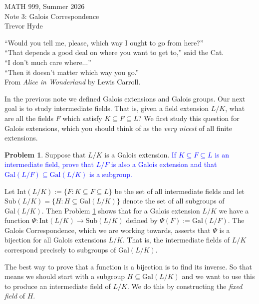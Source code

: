 \documentclass[11pt]{article}
\def\gal{\mathrm{Gal}}
\def\inter{\mathrm{Int}}
\def\sub{\mathrm{Sub}}
\theoremstyle{definition}
\newtheorem{problem}{Problem}[section]
\numberwithin{equation}{subsection}
\newcommand{\head}[1]{
	\begin{center}
		{\large #1}
		\vspace{.05 in}
	\end{center}
	\bigskip 
}
\newcommand{\blue}[1]{\textcolor{blue}{#1}}
\begin{document}
\pagestyle{plain}

\setcounter{section}{3}   

\head{MATH 999, Summer 2026\\ Note 3: Galois Correspondence\\
Trevor Hyde}


\begin{center}
   ``Would you tell me, please, which way I ought to go from here?''\\
   ``That depends a good deal on where you want to get to,'' said the Cat.\\
   ``I don’t much care where$\ldots$''\\
   ``Then it doesn’t matter which way you go.''\\

   \vspace{.1in}
   From \emph{Alice in Wonderland} by Lewis Carroll.
\end{center}
\vspace{.1in}

In the previous note we defined Galois extensions and Galois groups.
Our next goal is to study intermediate fields.
That is, given a field extension $L/K$, what are all the fields $F$ which satisfy $K \subseteq F \subseteq L$?
We first study this question for Galois extensions, which you should think of as the \emph{very nicest} of all finite extensions.

\begin{problem}
\label{prob: int to sub}
    Suppose that $L/K$ is a Galois extension.
    \blue{If $K \subseteq F \subseteq L$ is an intermediate field, prove that $L/F$ is also a Galois extension and that $\gal(L/F) \subseteq \gal(L/K)$ is a subgroup.}
\end{problem}

Let $\inter(L/K) := \{F : K \subseteq F \subseteq L\}$ be the set of all intermediate fields and let $\sub(L/K) = \{H : H \subseteq \gal(L/K)\}$ denote the set of all subgroups of $\gal(L/K)$.
Then Problem \ref{prob: int to sub} shows that for a Galois extension $L/K$ we have a function $\Psi: \inter(L/K) \to \sub(L/K)$ defined by $\Psi(F) :=  \gal(L/F)$.
The Galois Correspondence, which we are working towards, asserts that $\Psi$ is a bijection for all Galois extensions $L/K$.
That is, the intermediate fields of $L/K$ correspond precisely to subgroups of $\gal(L/K)$.

The best way to prove that a function is a bijection is to find its inverse.
So that means we should start with a subgroup $H \subseteq \gal(L/K)$ and we want to use this to produce an intermediate field of $L/K$.
We do this by constructing the \emph{fixed field} of $H$.
\end{document}
